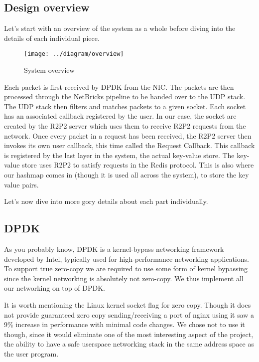 \documentclass[11pt]{article}
\begin{document}
\subsection{Design overview}

Let's start with an overview of the system as a whole before diving
into the details of each individual piece.

\begin{figure}[htb!]
  \texttt{[image: ../diagram/overview]}
  \caption{System overview}
  \label{fig:design-overview}
\end{figure}

Each packet is first received by DPDK from the NIC. The packets are
then processed through the NetBricks pipeline to be handed over to the
UDP stack. The UDP stack then filters and matches packets to a given
socket. Each socket has an associated callback registered by the
user. In our case, the socket are created by the R2P2 server which
uses them to receive R2P2 requests from the network. Once every packet
in a request has been received, the R2P2 server then invokes its own
user callback, this time called the Request Callback. This callback
is registered by the last layer in the system, the actual key-value
store. The key-value store uses R2P2 to satisfy requests in the Redis
protocol. This is also where our hashmap comes in (though it is used
all across the system), to store the key value pairs.

Let's now dive into more gory details about each part individually.


\subsection{DPDK}

As you probably know, DPDK is a kernel-bypass networking framework
developed by Intel, typically used for high-performance networking
applications. To support true zero-copy we are required to use some
form of kernel bypassing since the kernel networking is absolutely
not zero-copy. We thus implement all our networking on top of DPDK.

It is worth mentioning the Linux kernel socket flag for zero copy.
Though it does not provide guaranteed zero copy sending/receiving a
port of nginx using it saw a 9\% increase in performance with minimal
code changes. We chose not to use it though, since it would eliminate
one of the most interesting aspect of the project, the ability to have
a safe userspace networking stack in the same address space as the
user program.
\end{document}
